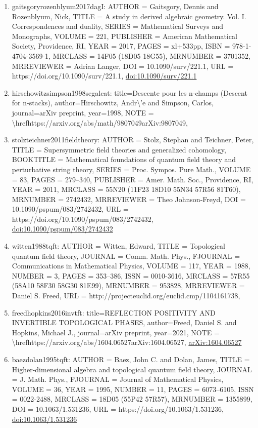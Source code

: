 \documentclass[11pt]{article}
\begin{document}
\begin{enumerate}[leftmargin=*]
  \item gaitsgoryrozenblyum2017dagI: AUTHOR = Gaitsgory, Dennis and Rozenblyum, Nick, TITLE = A study in derived algebraic geometry. Vol. I. Correspondences and duality, SERIES = Mathematical Surveys and Monographs, VOLUME = 221, PUBLISHER = American Mathematical Society, Providence, RI, YEAR = 2017, PAGES = xl+533pp, ISBN = 978-1-4704-3569-1, MRCLASS = 14F05 (18D05 18G55), MRNUMBER = 3701352, MRREVIEWER = Adrian Langer, DOI = 10.1090/surv/221.1, URL = https://doi.org/10.1090/surv/221.1, \href{https://doi.org/10.1090/surv/221.1}{doi:10.1090/surv/221.1}
  \item hirschowitzsimpson1998segalcat: title=Descente pour les n-champs (Descent for n-stacks), author=Hirschowitz, Andr\textbackslash{}'e and Simpson, Carlos, journal=arXiv preprint, year=1998, NOTE = \textbackslash{}hrefhttps://arxiv.org/abs/math/9807049arXiv:9807049,
  \item stolzteichner2011fieldtheory: AUTHOR = Stolz, Stephan and Teichner, Peter, TITLE = Supersymmetric field theories and generalized cohomology, BOOKTITLE = Mathematical foundations of quantum field theory and perturbative string theory, SERIES = Proc. Sympos. Pure Math., VOLUME = 83, PAGES = 279--340, PUBLISHER = Amer. Math. Soc., Providence, RI, YEAR = 2011, MRCLASS = 55N20 (11F23 18D10 55N34 57R56 81T60), MRNUMBER = 2742432, MRREVIEWER = Theo Johnson-Freyd, DOI = 10.1090/pspum/083/2742432, URL = https://doi.org/10.1090/pspum/083/2742432, \href{https://doi.org/10.1090/pspum/083/2742432}{doi:10.1090/pspum/083/2742432}
  \item witten1988tqft: AUTHOR = Witten, Edward, TITLE = Topological quantum field theory, JOURNAL = Comm. Math. Phys., FJOURNAL = Communications in Mathematical Physics, VOLUME = 117, YEAR = 1988, NUMBER = 3, PAGES = 353--386, ISSN = 0010-3616, MRCLASS = 57R55 (58A10 58F30 58G30 81E99), MRNUMBER = 953828, MRREVIEWER = Daniel S. Freed, URL = http://projecteuclid.org/euclid.cmp/1104161738,
  \item freedhopkins2016invtft: title=REFLECTION POSITIVITY AND INVERTIBLE TOPOLOGICAL PHASES, author=Freed, Daniel S. and Hopkins, Michael J., journal=arXiv preprint, year=2021, NOTE = \textbackslash{}hrefhttps://arxiv.org/abs/1604.06527arXiv:1604.06527, \href{https://arxiv.org/abs/1604.06527}{arXiv:1604.06527}
  \item baezdolan1995tqft: AUTHOR = Baez, John C. and Dolan, James, TITLE = Higher-dimensional algebra and topological quantum field theory, JOURNAL = J. Math. Phys., FJOURNAL = Journal of Mathematical Physics, VOLUME = 36, YEAR = 1995, NUMBER = 11, PAGES = 6073--6105, ISSN = 0022-2488, MRCLASS = 18D05 (55P42 57R57), MRNUMBER = 1355899, DOI = 10.1063/1.531236, URL = https://doi.org/10.1063/1.531236, \href{https://doi.org/10.1063/1.531236}{doi:10.1063/1.531236}

\end{enumerate}
\end{document}
